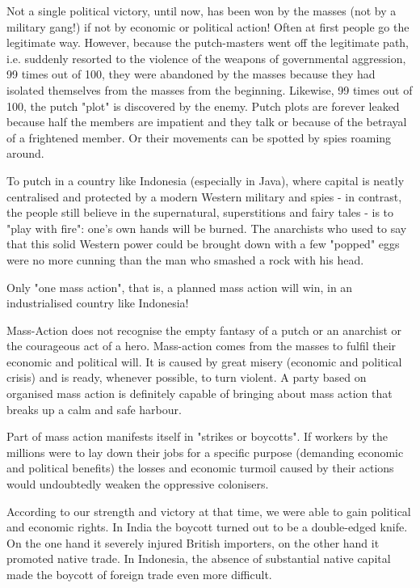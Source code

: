 Not a single political victory, until now, has been won by the masses (not by a military gang!) if not by economic or political action! 
Often at first people go the legitimate way. However, because the putch-masters went off the legitimate path, i.e. suddenly resorted 
to the violence of the weapons of governmental aggression, 99 times out of 100, they were abandoned by the masses because they had 
isolated themselves from the masses from the beginning. Likewise, 99 times out of 100, the putch "plot" is discovered by the enemy. 
Putch plots are forever leaked because half the members are impatient and they talk or because of the betrayal of a frightened member. 
Or their movements can be spotted by spies roaming around.\nline

To putch in a country like Indonesia (especially in Java), where capital is neatly centralised and protected by a modern Western military 
and spies - in contrast, the people still believe in the supernatural, superstitions and fairy tales - is to "play with fire": one's own 
hands will be burned. The anarchists who used to say that this solid Western power could be brought down with a few "popped" eggs were no 
more cunning than the man who smashed a rock with his head.\nline

Only "one mass action", that is, a planned mass action will win, in an industrialised country like Indonesia!\nline

Mass-Action does not recognise the empty fantasy of a putch or an anarchist or the courageous act of a hero. Mass-action comes 
from the masses to fulfil their economic and political will. It is caused by great misery (economic and political crisis) and is 
ready, whenever possible, to turn violent. A party based on organised mass action is definitely capable of bringing about mass 
action that breaks up a calm and safe harbour.\nline

Part of mass action manifests itself in "strikes or boycotts". If workers by the millions were to lay down their jobs for a specific purpose 
(demanding economic and political benefits) the losses and economic turmoil caused by their actions would undoubtedly weaken the 
oppressive colonisers.\nline

According to our strength and victory at that time, we were able to gain political and economic rights. In India the boycott turned out to 
be a double-edged knife. On the one hand it severely injured British importers, on the other hand it promoted native trade. In Indonesia, 
the absence of substantial native capital made the boycott of foreign trade even more difficult.\nline

